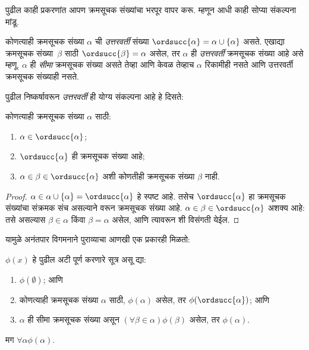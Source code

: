 \documentclass[../../../include/open-logic-section]{subfiles}
\begin{document}

पुढील काही प्रकरणांत आपण क्रमसूचक संख्यांचा भरपूर वापर करू. म्हणून आधी काही सोप्या संकल्पना मांडू.

\begin{defn}
कोणत्याही क्रमसूचक संख्या $\alpha$ ची \emph{उत्तरवर्ती} संख्या $\ordsucc{\alpha}
=\alpha \cup \{\alpha\}$ असते. एखाद्या क्रमसूचक संख्या~$\beta$ साठी $\ordsucc{\beta} = \alpha$ असेल, तर $\alpha$ ही \emph{उत्तरवर्ती} क्रमसूचक संख्या आहे असे म्हणू. $\alpha$ ही \emph{सीमा} क्रमसूचक संख्या असते तेव्हा आणि केवळ तेव्हाच $\alpha$ रिकामीही नसते आणि उत्तरवर्ती क्रमसूचक संख्याही नसते.
\end{defn}
\noindent
पुढील निष्कर्षावरून \emph{उत्तरवर्ती} ही योग्य संकल्पना आहे हे दिसते:

\begin{prop}
कोणत्याही क्रमसूचक संख्या $\alpha$ साठी:
\begin{enumerate}
	\item $\alpha \in \ordsucc{\alpha}$;
	\item $\ordsucc{\alpha}$ ही क्रमसूचक संख्या आहे;
	\item $\alpha \in \beta \in
	\ordsucc{\alpha}$ अशी कोणतीही क्रमसूचक संख्या $\beta$ नाही.
	\end{enumerate}
\end{prop}

\begin{proof}
$\alpha \in \alpha \cup \{\alpha\} = \ordsucc{\alpha}$ हे स्पष्ट आहे. तसेच $\ordsucc{\alpha}$ हा क्रमसूचक संख्यांचा संक्रमक संच असल्याने  वरून क्रमसूचक संख्या आहे. $\alpha \in \beta \in \ordsucc{\alpha}$ अशक्य आहे: तसे असल्यास $\beta \in \alpha$ किंवा $\beta = \alpha$ असेल, आणि त्यावरून  शी विसंगती येईल.
\end{proof}
\noindent
यामुळे अनंतपार विगमनाने पुराव्याचा आणखी एक प्रकारही मिळतो:

\begin{thm}[सुलभ अनंतपार विगमन]
$\phi(x)$ हे पुढील अटी पूर्ण करणारे सूत्र असू द्या:
\begin{enumerate}
	\item $\phi(\emptyset)$; आणि
	\item कोणत्याही क्रमसूचक संख्या $\alpha$ साठी, $\phi(\alpha)$ असेल, तर $\phi(\ordsucc{\alpha})$; आणि
	\item $\alpha$ ही सीमा क्रमसूचक संख्या असून $(\forall \beta \in
	\alpha)\phi(\beta)$ असेल, तर $\phi(\alpha)$.
\end{enumerate}
मग $\forall \alpha \phi(\alpha)$.
\end{thm}
\end{document}
